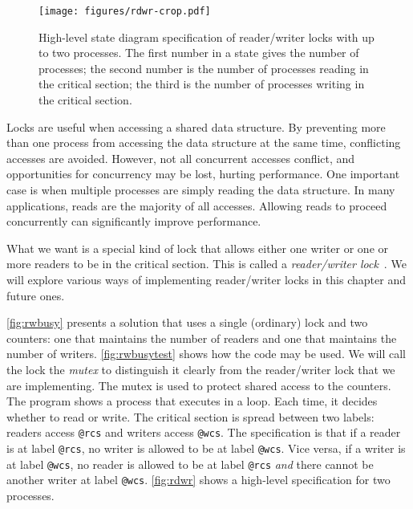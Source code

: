 \documentclass{report}
\begin{document}
\begin{figure}
\begin{center}
\texttt{[image: figures/rdwr-crop.pdf]}
\end{center}
\caption{High-level state diagram specification of reader/writer locks with
up to two processes.
The first number in a state gives the number of processes; the second number is the
number of processes reading in the critical section; the third is the number of
processes writing in the critical section.}
\label{fig:rdwr}
\end{figure}

Locks are useful when accessing a shared data structure.  By preventing
more than one process from accessing the data structure at the same
time, conflicting accesses are avoided.  However, not all concurrent
accesses conflict, and opportunities for concurrency may be lost,
hurting performance.  One important case is when multiple processes
are simply reading the data structure.
In many applications, reads are the majority of all accesses.
Allowing reads to proceed concurrently can significantly improve performance.

What we want is a special kind of lock that allows either one writer
or one or more readers to be in the critical section.  This is called
a \emph{reader/writer lock}~\cite{CHP71}.
We will explore various ways of implementing reader/writer locks in
this chapter and future ones.

\autoref{fig:rwbusy} presents a solution that uses a
single (ordinary) lock and two counters: one that maintains the number
of readers and one that maintains the number of writers.
\autoref{fig:rwbusytest} shows how the code may be used.
We will call the lock the \emph{mutex} to distinguish it clearly from
the reader/writer lock that we are implementing.
The mutex is used to protect shared access to the counters.
The program shows a process that executes in a loop.
Each time, it decides whether to read or write.
The critical section is spread between two labels:
readers access \texttt{@rcs} and writers access \texttt{@wcs}.
The specification is that if a reader is at label \texttt{@rcs},
no writer is allowed to be at label \texttt{@wcs}.  Vice versa, if
a writer is at label \texttt{@wcs}, no reader is allowed to be at
label \texttt{@rcs} \emph{and} there cannot be another writer at
label \texttt{@wcs}.  \autoref{fig:rdwr} shows a high-level
specification for two processes.
\end{document}
